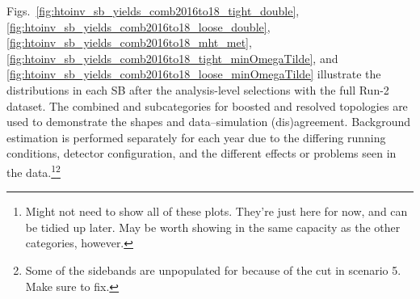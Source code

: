 Figs.~\ref{fig:htoinv_sb_yields_comb2016to18_tight_double}, \ref{fig:htoinv_sb_yields_comb2016to18_loose_double}, \ref{fig:htoinv_sb_yields_comb2016to18_mht_met}, \ref{fig:htoinv_sb_yields_comb2016to18_tight_minOmegaTilde}, and \ref{fig:htoinv_sb_yields_comb2016to18_loose_minOmegaTilde} illustrate the \ptmiss distributions in each \gls{SB} after the analysis-level selections with the full Run-2 dataset. The combined \ttH and \VH subcategories for boosted and resolved topologies are used to demonstrate the shapes and data--simulation (dis)agreement. Background estimation is performed separately for each year due to the differing running conditions, detector configuration, and the different effects or problems seen in the data.\footnote{Might not need to show all of these plots. They're just here for now, and can be tidied up later. May be worth showing \ggH in the same capacity as the other categories, however.}\footnote{Some of the sidebands are unpopulated for \VH because of the \mindphi cut in scenario 5. Make sure to fix.}

